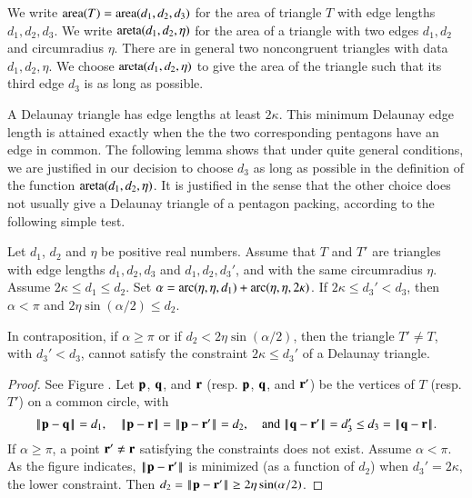 
We write ${\operatorname{area}}(T)= {\operatorname{area}}(d_1,d_2,d_3)$ for the area of triangle $T$
with edge lengths $d_1,d_2,d_3$.  We write
${\operatorname{areta}}(d_1,d_2,\eta)$ for the area of a triangle with two edges
$d_1,d_2$ and circumradius $\eta$.  There are in general two
noncongruent triangles with data $d_1,d_2,\eta$.  We choose
${\operatorname{areta}}(d_1,d_2,\eta)$ to give the area of the triangle such that its
third edge $d_3$ is as long as possible.

A Delaunay triangle has edge lengths at least $2\kappa$.  This minimum
Delaunay edge length is attained exactly when the the two
corresponding pentagons have an edge in common.  The following lemma
shows that under quite general conditions, we are justified in our
decision to choose $d_3$ as long as possible in the definition of the
function ${\operatorname{areta}}(d_1,d_2,\eta)$.  It is justified in the sense that
the other choice does not usually give a Delaunay triangle of a pentagon
packing, according to the following simple test.

\begin{lemma}  Let $d_1$, $d_2$
and  $\eta$ be positive real numbers.
Assume that $T$ and $T'$ are triangles with edge lengths
$d_1,d_2,d_3$ and $d_1,d_2,d_3'$,  and with the same circumradius
$\eta$. Assume $2\kappa\le d_1\le d_2$.  Set
 $\alpha = \operatorname{arc}(\eta,\eta,d_1)+\operatorname{arc}(\eta,\eta,2\kappa)$.
If $2\kappa \le d_3' < d_3$, then $\alpha < \pi$ and $2\eta\sin(\alpha/2) \le d_2$.
\end{lemma}

In contraposition, if $\alpha\ge\pi$ or if $d_2 < 2\eta\sin(\alpha/2)$,
then the triangle $T'\ne T$, with $d_3' < d_3$,
cannot satisfy the constraint $2\kappa\le d_3'$ of a  Delaunay triangle.


\begin{proof} See Figure .
Let ${\mathbf p}$, ${\mathbf q}$, and ${\mathbf r}$ (resp. ${\mathbf p}$, ${\mathbf q}$, and ${\mathbf r}'$) be the vertices of $T$
(resp. $T'$) on a common  circle, with
\[
\norm{\p}{\q} =d_1, \quad\norm{\p}{\r}=\norm{\p}{\r'}=d_2, \quad\text{and } 
\norm{\q}{\r'} = d_3' \le d_3=\norm{\q}{\r}.
\]
If $\alpha\ge\pi$, a point ${\mathbf r}'\ne {\mathbf r}$ satisfying the constraints does not exist.
Assume $\alpha < \pi$. 
As the figure indicates, $\norm{\p}{\r'}$ is minimized (as a function of $d_2$)
when $d_3' = 2\kappa$, the lower constraint.  Then
$d_2 = \norm{\p}{\r'}\ge 2\eta\sin(\alpha/2)$.
\end{proof}





